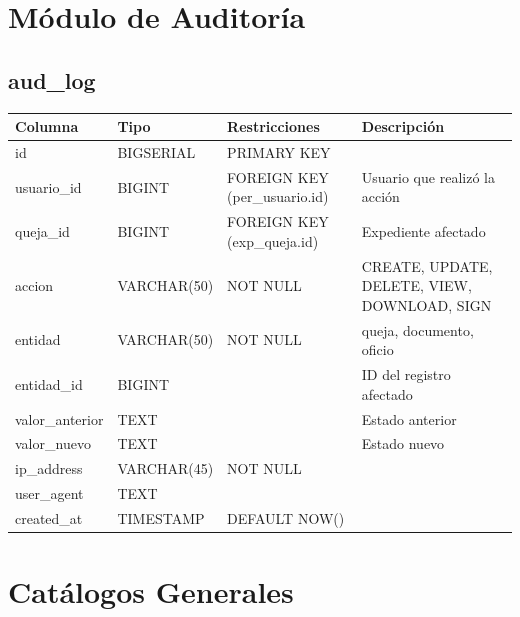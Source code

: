 \documentclass[12pt, a4paper]{article}
\begin{document}
\section{Módulo de Auditoría}
\label{sec:auditoria}

\subsection{aud\_log}
\begin{longtable}{|p{3.5cm}|p{2.5cm}|p{3cm}|p{5cm}|}
    \hline
    \rowcolor[gray]{0.9}
    \textbf{Columna} & \textbf{Tipo} & \textbf{Restricciones} & \textbf{Descripción} \\
    \hline
    id & BIGSERIAL & PRIMARY KEY & \\
    \hline
    usuario\_id & BIGINT & FOREIGN KEY (per\_usuario.id) & Usuario que realizó la acción \\
    \hline
    queja\_id & BIGINT & FOREIGN KEY (exp\_queja.id) & Expediente afectado \\
    \hline
    accion & VARCHAR(50) & NOT NULL & CREATE, UPDATE, DELETE, VIEW, DOWNLOAD, SIGN \\
    \hline
    entidad & VARCHAR(50) & NOT NULL & queja, documento, oficio \\
    \hline
    entidad\_id & BIGINT & & ID del registro afectado \\
    \hline
    valor\_anterior & TEXT & & Estado anterior \\
    \hline
    valor\_nuevo & TEXT & & Estado nuevo \\
    \hline
    ip\_address & VARCHAR(45) & NOT NULL & \\
    \hline
    user\_agent & TEXT & & \\
    \hline
    created\_at & TIMESTAMP & DEFAULT NOW() & \\
    \hline
\end{longtable}

\section{Catálogos Generales}
\label{sec:catalogos}
\end{document}
